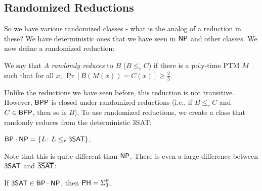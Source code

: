\subsection{Randomized Reductions}
So we have various randomized classes - what is the analog of a reduction in these? We have deterministic ones that we have seen in ${\mathsf{NP}}$ and other classes. We now define a randomized reduction:
\begin{definition}
We say that $A$ \emph{randomly reduces} to $B$ ($B \le_r C$) if there is a poly-time PTM $M$ such that for all $x$, $\Pr[B(M(x)) = C(x)] \ge \frac{2}{3}$. 
\end{definition}
Unlike the reductions we have seen before, this reduction is not transitive. However, ${\mathsf{BPP}}$ is closed under randomized reductions (i.e., if $B \le_r C$ and $C \in {\ensuremath{\mathsf{BPP}}}$, then so is $B$). To use randomized reductions, we create a class that randomly reduces from the deterministic 3SAT:
\begin{definition}
${\mathsf{BP}}\cdot {\ensuremath{\mathsf{NP}}} = \{L \colon L \le_r {\mathsf{3SAT}}\}$. 
\end{definition}
Note that this is quite different than ${\mathsf{NP}}$. There is even a large difference between ${\mathsf{3SAT}}$ and $\overline{{\mathsf{3SAT}}}$:
\begin{theorem}
If ${\mathsf{3SAT}} \in {\ensuremath{\mathsf{BP}}}\cdot {\ensuremath{\mathsf{NP}}}$, then ${\mathsf{PH}} = \Sigma_3^{\mathsf{P}}$. 
\end{theorem}  

\newcommand{\UPATH}{\lang{UPATH}}
